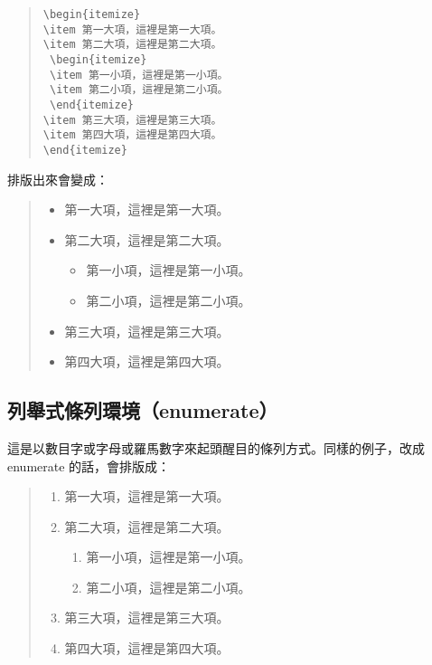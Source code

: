 \begin{quote}
   \begin{verbatim}
\begin{itemize}
\item 第一大項，這裡是第一大項。
\item 第二大項，這裡是第二大項。
 \begin{itemize}
 \item 第一小項，這裡是第一小項。
 \item 第二小項，這裡是第二小項。
 \end{itemize}
\item 第三大項，這裡是第三大項。
\item 第四大項，這裡是第四大項。
\end{itemize}
\end{verbatim}
\end{quote}

排版出來會變成：

\begin{quote}
   \begin{itemize}
      \item 第一大項，這裡是第一大項。
      \item 第二大項，這裡是第二大項。
            \begin{itemize}
               \item 第一小項，這裡是第一小項。
               \item 第二小項，這裡是第二小項。
            \end{itemize}
      \item 第三大項，這裡是第三大項。
      \item 第四大項，這裡是第四大項。
   \end{itemize}
\end{quote}

\subsection{列舉式條列環境（enumerate）}
\label{subsec:enume}

這是以數目字或字母或羅馬數字來起頭醒目的條列方式。同樣的例子，改成 {\ttfamily enumerate} 的話，會排版成：

\begin{quote}
   \begin{enumerate}
      \item 第一大項，這裡是第一大項。
      \item 第二大項，這裡是第二大項。
            \begin{enumerate}
               \item 第一小項，這裡是第一小項。
               \item 第二小項，這裡是第二小項。
            \end{enumerate}
      \item 第三大項，這裡是第三大項。
      \item 第四大項，這裡是第四大項。
   \end{enumerate}
\end{quote}


